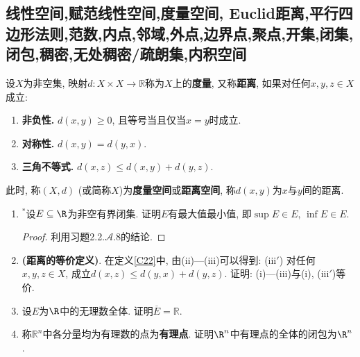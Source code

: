 \subsection{线性空间,赋范线性空间,度量空间, Euclid距离,平行四边形法则,范数,内点,邻域,外点,边界点,聚点,开集,闭集,闭包,稠密,无处稠密/疏朗集,内积空间}
\begin{definition}\label{C22}
  设\(X\)为非空集, 映射\(d:X\times X\rightarrow\mathbb{R}\)称为\(X\)上的\textbf{度量}, 又称\textbf{距离}, 如果对任何\(x,y,z\in X\)成立:
  \begin{enumerate}[label=(\roman*)]
    \item \textbf{非负性.} \(d(x,y)\geqslant 0\), 且等号当且仅当\(x=y\)时成立.
    \item \textbf{对称性.} \(d(x,y)=d(y,x)\).
    \item \textbf{三角不等式.} \(d(x,z)\leqslant d(x,y)+d(y,z)\).
  \end{enumerate}
  此时, 称\((X,d)\) (或简称\(X\))为\textbf{度量空间}或\textbf{距离空间}, 
  称\(d(x,y)\)为\(x\)与\(y\)间的距离.
\end{definition}
\begin{3a}
\begin{enumerate}
\item ${}^*$设\(E\subseteq \R\)为非空有界闭集. 
证明\(E\)有最大值最小值, 即\(\sup E\in E,\,\inf E\in E\).
\begin{proof}
利用习题2.2.$\mathcal{A}$.8的结论.
\end{proof}
\item \textbf{(距离的等价定义)}. 在定义\ref{C22}中, 由(ii)---(iii)可以得到: (iii\('\)) 对任何\(x,y,z\in X\), 成立\(d(x,z)\leqslant d(y,x)+d(y,z)\).
证明: (i)---(iii)与(i), (iii\('\))等价.
\item 设\(E\)为\(\R\)中的无理数全体. 证明\(\overline{E}=\mathbb{R}\).
\item 称\(\mathbb{R}^n\)中各分量均为有理数的点为\textbf{有理点}. 
证明\(\R^n\)中有理点的全体的闭包为\(\R^n\).
\end{enumerate}
\end{3a}
